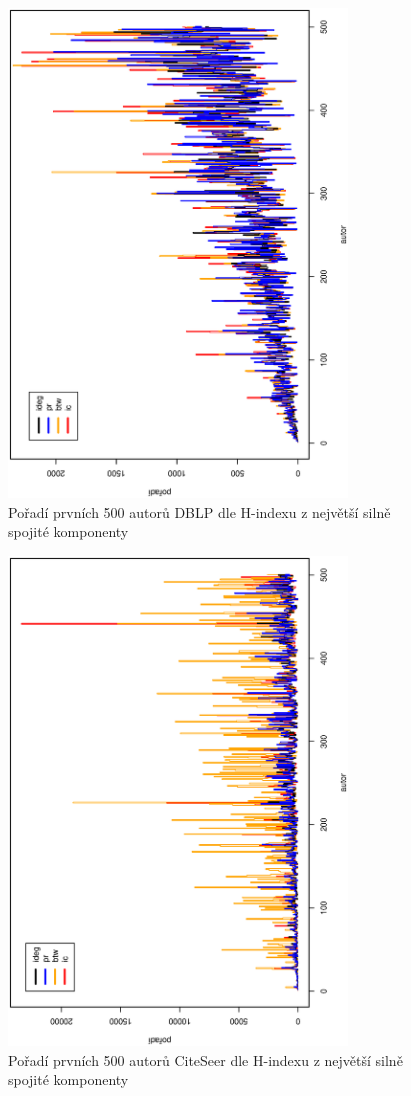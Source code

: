 \documentclass{bakalarka}
\begin{document}
\begin{figure}[!ht]
\centering
	\includegraphics[width=9cm,angle=270]{grafDBLP.eps}
	\caption{Pořadí prvních 500 autorů DBLP dle H-indexu z největší silně spojité komponenty}
	\label{fig:poradiDBLP}
\end{figure}
\begin{figure}[!ht]
\centering
	\includegraphics[width=9cm,angle=270]{grafCS.eps}
	\caption{Pořadí prvních 500 autorů CiteSeer dle H-indexu z největší silně spojité komponenty}
	\label{fig:poradiCS}
\end{figure}
\end{document}
